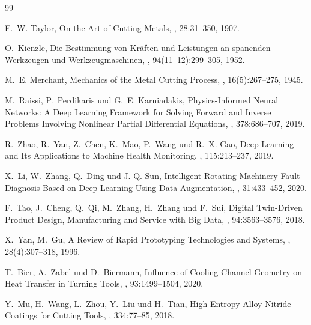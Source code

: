 ﻿\documentclass[a4paper,12pt]{article}
\theoremstyle{definition}
\begin{document}
\begin{thebibliography}{99}

F.~W. Taylor,
\newblock On the Art of Cutting Metals,
, 28:31--350, 1907.

O.~Kienzle,
\newblock Die Bestimmung von Kräften und Leistungen an spanenden Werkzeugen und Werkzeugmaschinen,
, 94(11--12):299--305, 1952.

M.~E. Merchant,
\newblock Mechanics of the Metal Cutting Process,
, 16(5):267--275, 1945.

M.~Raissi, P.~Perdikaris und G.~E. Karniadakis,
\newblock Physics-Informed Neural Networks: A Deep Learning Framework for Solving
Forward and Inverse Problems Involving Nonlinear Partial Differential Equations,
, 378:686--707, 2019.

R.~Zhao, R.~Yan, Z.~Chen, K.~Mao, P.~Wang und R.~X. Gao,
\newblock Deep Learning and Its Applications to Machine Health Monitoring,
, 115:213--237, 2019.

X.~Li, W.~Zhang, Q.~Ding und J.-Q. Sun,
\newblock Intelligent Rotating Machinery Fault Diagnosis Based on Deep Learning
Using Data Augmentation,
, 31:433--452, 2020.

F.~Tao, J.~Cheng, Q.~Qi, M.~Zhang, H.~Zhang und F.~Sui,
\newblock Digital Twin-Driven Product Design, Manufacturing and Service with
Big Data,
,
94:3563--3576, 2018.

X.~Yan, M.~Gu,
\newblock A Review of Rapid Prototyping Technologies and Systems,
, 28(4):307--318, 1996.

T.~Bier, A.~Zabel und D.~Biermann,
\newblock Influence of Cooling Channel Geometry on Heat Transfer in Turning Tools,
, 93:1499--1504, 2020.

Y.~Mu, H.~Wang, L.~Zhou, Y.~Liu und H.~Tian,
\newblock High Entropy Alloy Nitride Coatings for Cutting Tools,
, 334:77--85, 2018.


\end{thebibliography}
\end{document}

